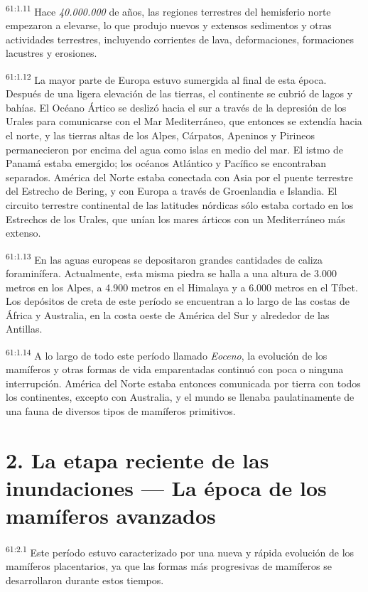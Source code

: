 \par
\textsuperscript{61:1.11} Hace \textit{40.000.000} de años, las regiones terrestres del hemisferio norte empezaron a elevarse, lo que produjo nuevos y extensos sedimentos y otras actividades terrestres, incluyendo corrientes de lava, deformaciones, formaciones lacustres y erosiones.

\par
\textsuperscript{61:1.12} La mayor parte de Europa estuvo sumergida al final de esta época. Después de una ligera elevación de las tierras, el continente se cubrió de lagos y bahías. El Océano Ártico se deslizó hacia el sur a través de la depresión de los Urales para comunicarse con el Mar Mediterráneo, que entonces se extendía hacia el norte, y las tierras altas de los Alpes, Cárpatos, Apeninos y Pirineos permanecieron por encima del agua como islas en medio del mar. El istmo de Panamá estaba emergido; los océanos Atlántico y Pacífico se encontraban separados. América del Norte estaba conectada con Asia por el puente terrestre del Estrecho de Bering, y con Europa a través de Groenlandia e Islandia. El circuito terrestre continental de las latitudes nórdicas sólo estaba cortado en los Estrechos de los Urales, que unían los mares árticos con un Mediterráneo más extenso.

\par
\textsuperscript{61:1.13} En las aguas europeas se depositaron grandes cantidades de caliza foraminífera. Actualmente, esta misma piedra se halla a una altura de 3.000 metros en los Alpes, a 4.900 metros en el Himalaya y a 6.000 metros en el Tíbet. Los depósitos de creta de este período se encuentran a lo largo de las costas de África y Australia, en la costa oeste de América del Sur y alrededor de las Antillas.

\par
\textsuperscript{61:1.14} A lo largo de todo este período llamado \textit{Eoceno}, la evolución de los mamíferos y otras formas de vida emparentadas continuó con poca o ninguna interrupción. América del Norte estaba entonces comunicada por tierra con todos los continentes, excepto con Australia, y el mundo se llenaba paulatinamente de una fauna de diversos tipos de mamíferos primitivos.

\section*{2. La etapa reciente de las inundaciones --- La época de los mamíferos avanzados}
\par
\textsuperscript{61:2.1} Este período estuvo caracterizado por una nueva y rápida evolución de los mamíferos placentarios, ya que las formas más progresivas de mamíferos se desarrollaron durante estos tiempos.

